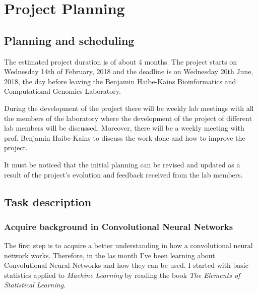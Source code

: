 

\section{Project Planning}

\subsection{Planning and scheduling}

The estimated project duration is of about 4 months. The project starts on Wednesday 14th of 
February, 2018 and the deadline is on Wednesday 20th June, 2018, the day before leaving the 
Benjamin Haibe-Kains Bioinformatics and Computational Genomics Laboratory.

During the development of the project there will be weekly lab meetings with all the
members of the laboratory where the development of the project of different lab members will
be discussed. Moreover, there will be a weekly meeting with prof. Benjamin Haibe-Kains to
discuss the work done and how to improve the project.

It must be noticed that the initial planning can be revised and updated as a result of the 
project's evolution and feedback received from the lab members. 

\subsection{Task description}

\subsubsection{Acquire background in Convolutional Neural Networks}

The first step is to acquire a better understanding in how a convolutional neural network works.
Therefore, in the las month I've been learning about Convolutional Neural Networks and how they
can be used. 
I started with basic statistics applied to \emph{Machine Learning} by reading the book 
\emph{The Elements of Statistical Learning}.~\cite{ElementsStatisticalLearning}

